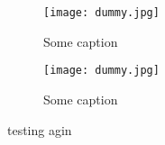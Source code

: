 \begin{figure}[h!]
    \texttt{[image: dummy.jpg]}
    \caption{Some caption}
    \label{fig:some_ref}
\end{figure}

\begin{figure}[h!]
    \texttt{[image: dummy.jpg]}
    \caption{Some caption}
    \label{fig:some_ref} 
\end{figure}



 
\twocolumngrid
 
testing agin





